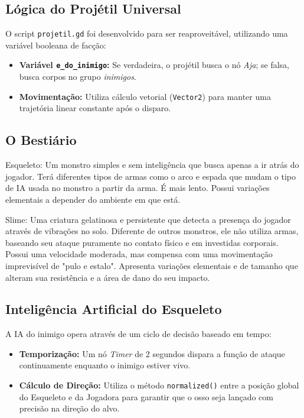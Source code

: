 \documentclass[12pt, a4paper]{article} %
\begin{document}
	
	\subsection{Lógica do Projétil Universal}
	O script \texttt{projetil.gd} foi desenvolvido para ser reaproveitável, utilizando uma variável booleana de facção:
	\begin{itemize}
		\item \textbf{Variável \texttt{e\_do\_inimigo}:} Se verdadeira, o projétil busca o nó \textit{Aja}; se falsa, busca corpos no grupo \textit{inimigos}.
		\item \textbf{Movimentação:} Utiliza cálculo vetorial (\texttt{Vector2}) para manter uma trajetória linear constante após o disparo.
	\end{itemize}
	
	\subsection{O Bestiário}
	
	Esqueleto: Um monstro simples e sem inteligência que busca apenas a ir atrás do jogador. Terá diferentes tipos de armas como o arco e espada que mudam o tipo de IA usada no monstro a partir da arma. É mais lento. Possui variações elementais a depender do ambiente em que está.
	
	Slime: Uma criatura gelatinosa e persistente que detecta a presença do jogador através de vibrações no solo. Diferente de outros monstros, ele não utiliza armas, baseando seu ataque puramente no contato físico e em investidas corporais. Possui uma velocidade moderada, mas compensa com uma movimentação imprevisível de "pulo e estalo". Apresenta variações elementais e de tamanho que alteram sua resistência e a área de dano do seu impacto. 
	
	\subsection{Inteligência Artificial do Esqueleto}
	A IA do inimigo opera através de um ciclo de decisão baseado em tempo:
	\begin{itemize}
		\item \textbf{Temporização:} Um nó \textit{Timer} de 2 segundos dispara a função de ataque continuamente enquanto o inimigo estiver vivo.
		\item \textbf{Cálculo de Direção:} Utiliza o método \texttt{normalized()} entre a posição global do Esqueleto e da Jogadora para garantir que o osso seja lançado com precisão na direção do alvo.
	\end{itemize}
	
\end{document}
